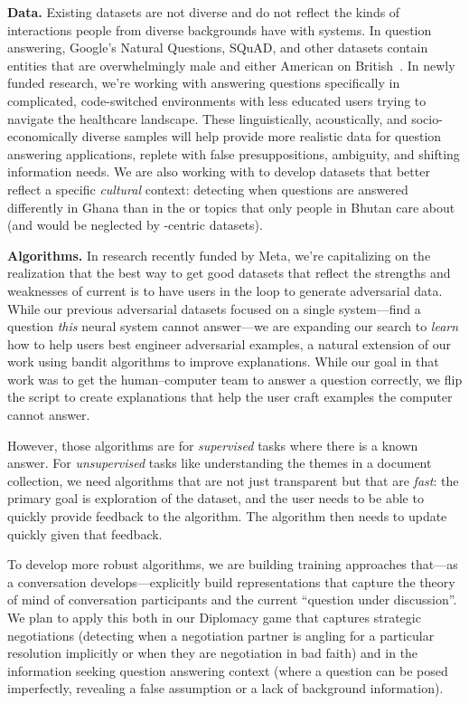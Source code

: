 {\bf Data.}
%
Existing datasets are not diverse and do
not reflect the kinds of interactions people from diverse backgrounds
have with  systems.
%
In question answering, Google's Natural Questions, SQuAD, and other
datasets contain entities that are overwhelmingly male and either
American on British~\cite{gor-21}.
%
In newly funded  research, we're working with answering
questions specifically in complicated, code-switched environments with
less educated users trying to navigate the healthcare landscape.
%
These linguistically, acoustically, and socio-economically diverse
samples will help provide more realistic data for question answering
applications, replete with false presuppositions, ambiguity, and
shifting information needs.
%
We are also working with  to develop datasets that better
reflect a specific \emph{cultural} context: detecting when questions
are answered differently in Ghana than in the  or topics that
only people in Bhutan care about (and would be neglected by
-centric datasets).

{\bf Algorithms.} In research recently funded by Meta, we're capitalizing on
the realization that the best way to get good datasets that reflect
the strengths and weaknesses of current  is to have users in the loop to generate adversarial data.
%
While our previous adversarial datasets focused on a single
system---find a question \emph{this} neural system cannot answer---we
are expanding our search to \emph{learn} how to help users best
engineer adversarial examples, a natural extension of our work using
bandit algorithms to improve explanations.
%
While our goal in that work was to get the human--computer team to
answer a question correctly, we flip the script to create explanations
that help the user craft examples the computer cannot answer.

However, those algorithms are for \emph{supervised} tasks where there
is a known answer.
%
For \emph{unsupervised} tasks like understanding the themes in a
document collection, we need algorithms
that are not just transparent but that are \emph{fast}: the primary
goal is exploration of the dataset, and the user needs to be able to
quickly provide feedback to the algorithm.
%
The algorithm then needs to update quickly given that feedback.

To develop more robust algorithms, we are building training approaches
that---as a conversation develops---explicitly build representations that
capture the theory of mind of conversation participants and the
current ``question under discussion''.
%
We plan to apply this both in our Diplomacy game that captures
strategic negotiations (detecting when a negotiation partner is
angling for a particular resolution implicitly or when they are
negotiation in bad faith) and in the information seeking question
answering context (where a question can be posed imperfectly,
revealing a false assumption or a lack of background information).
%

